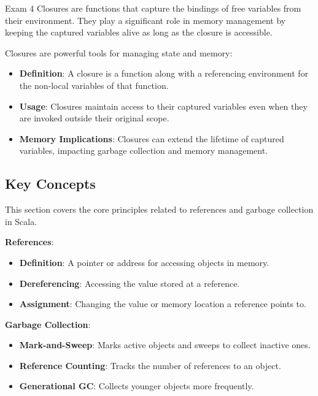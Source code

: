 \begin{examnotes}{Exam 4}
    Closures are functions that capture the bindings of free variables from their environment. They play a significant role in memory management by keeping the captured variables alive as long as the closure is accessible.
    
    \begin{highlight}
        Closures are powerful tools for managing state and memory:
        \begin{itemize}
            \item \textbf{Definition}: A closure is a function along with a referencing environment for the non-local variables of that function.
            \item \textbf{Usage}: Closures maintain access to their captured variables even when they are invoked outside their original scope.
            \item \textbf{Memory Implications}: Closures can extend the lifetime of captured variables, impacting garbage collection and memory management.
        \end{itemize}
    \end{highlight}
    
    \subsection*{Key Concepts}
    
    \begin{highlight}
        This section covers the core principles related to references and garbage collection in Scala. \vspace*{1em}
    
        \textbf{References}:
        \begin{itemize}
            \item \textbf{Definition}: A pointer or address for accessing objects in memory.
            \item \textbf{Dereferencing}: Accessing the value stored at a reference.
            \item \textbf{Assignment}: Changing the value or memory location a reference points to.
        \end{itemize}
        
        \textbf{Garbage Collection}:
        \begin{itemize}
            \item \textbf{Mark-and-Sweep}: Marks active objects and sweeps to collect inactive ones.
            \item \textbf{Reference Counting}: Tracks the number of references to an object.
            \item \textbf{Generational GC}: Collects younger objects more frequently.
        \end{itemize}
        

\end{highlight}
\end{examnotes}

